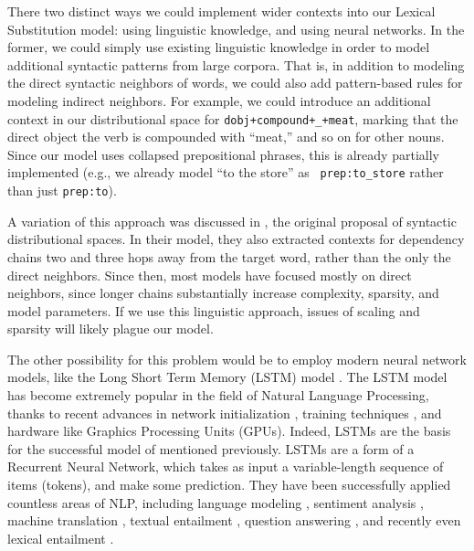 \documentclass[12pt]{article}
\begin{document}
There two distinct ways we could implement wider contexts into our Lexical
Substitution model: using linguistic knowledge, and using neural networks.
In the former, we could simply use existing linguistic knowledge in order to
model additional syntactic patterns from large corpora. That is, in
addition to modeling the direct syntactic neighbors of words,
we could also add pattern-based rules for modeling
indirect neighbors. For example, we could introduce an additional context
in our distributional space for {\tt dobj+compound+\_+meat}, marking that the
direct object the verb is compounded with ``meat,'' and so on for other nouns.
Since our model uses collapsed prepositional phrases, this is already
partially implemented (e.g., we already model ``to the store'' as {\tt
prep:to\_store} rather than just {\tt prep:to}).

A variation of this approach was discussed in , the
original proposal of syntactic distributional spaces. In their model, they also
extracted contexts for dependency chains two and three hops away from the
target word, rather than the only the direct neighbors. Since then, most models
have focused mostly on direct neighbors, since longer chains substantially
increase complexity, sparsity, and model parameters.
If we use this linguistic
approach, issues of scaling and sparsity will likely plague our model.

The other possibility for this problem would be to employ modern neural network
models, like the Long Short Term Memory (LSTM) model \cite{hochreiter:1997:nc}.
The LSTM model has become extremely popular in the field of Natural Language
Processing, thanks to recent advances in network initialization
\cite{glorot:2010:aistats}, training techniques
\cite{duchi:2011:jmlr,kingma:2014:arxiv}, and hardware like Graphics Processing
Units (GPUs). Indeed, LSTMs are the basis for the successful model of
 mentioned previously. LSTMs are a form of a
Recurrent Neural Network, which takes as input a variable-length sequence of
items (tokens), and make some prediction. They have been successfully applied
countless areas of NLP, including language modeling
\cite{sundermeyer:2012:interspeech,jozefowicz:2016:arxiv}, sentiment analysis
\cite{kumar:2016:icml}, machine translation \cite{sutskever:2014:nips},
textual entailment \cite{bowman:2015:emnlp}, question answering
\cite{hermann:2015:nips}, and recently even lexical entailment
\cite{shwartz:2016:acl}.
\end{document}
